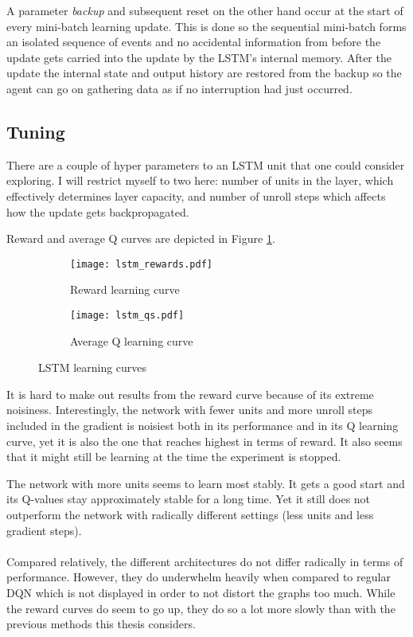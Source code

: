 A parameter \textit{backup} and subsequent reset
on the other hand
occur at the start of every mini-batch learning update.
This is done so the sequential mini-batch
forms an isolated sequence of events
and no accidental information from before the update gets carried into the update
by the LSTM's internal memory.
After the update
the internal state and output history
are restored from the backup
so the agent can go on gathering data
as if no interruption had just occurred.

\subsection{Tuning}
\label{sub:lstm_tuning}
There are a couple of hyper parameters to an LSTM unit
that one could consider exploring.
I will restrict myself to two here:
number of units in the layer,
which effectively determines layer capacity,
and number of unroll steps
which affects
how the update gets backpropagated.

Reward and average Q curves are depicted in Figure \ref{fig:lstm_both}.

\begin{figure}[htpb]
  \centering
  \begin{subfigure}[t]{.49\linewidth}
    \caption{Reward learning curve}
    \texttt{[image: lstm\_rewards.pdf]}
  \end{subfigure}
  \begin{subfigure}[t]{.49\linewidth}
    \caption{Average Q learning curve}
    \texttt{[image: lstm\_qs.pdf]}
  \end{subfigure}
  \caption{LSTM learning curves}
  \label{fig:lstm_both}
\end{figure}

It is hard to make out results from the reward curve because
of its extreme noisiness.
Interestingly,
the network with fewer units
and more unroll steps included in the gradient
is noisiest both in its performance
and in its Q learning curve,
yet it is also the one that reaches highest
in terms of reward.
It also seems that it might still be learning
at the time the experiment is stopped.

The network with more units seems to learn most stably.
It gets a good start and its Q-values stay approximately stable
for a long time.
Yet it still does not outperform
the network with radically different settings
(less units and less gradient steps).

\paragraph{}
Compared relatively,
the different architectures do not differ radically
in terms of performance.
However,
they do underwhelm heavily
when compared to regular DQN
which is not displayed in order to not distort the graphs too much.
While the reward curves do seem to go up,
they do so a lot more slowly
than with the previous methods
this thesis considers.

